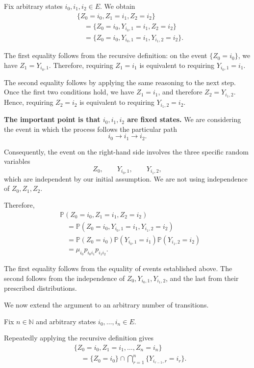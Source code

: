 \documentclass[11pt,a4paper]{article}
\begin{document}
Fix arbitrary states $i_0,i_1,i_2\in E$. We obtain
\[
\begin{aligned}
&\{Z_0=i_0,Z_1=i_1,Z_2=i_2\}\\
&\quad=
\{Z_0=i_0,Y_{i_0,1}=i_1,Z_2=i_2\}\\
&\quad=
\{Z_0=i_0,Y_{i_0,1}=i_1,Y_{i_1,2}=i_2\}.
\end{aligned}
\]

The first equality follows from the recursive definition: on the event $\{Z_0=i_0\}$, we have $Z_1=Y_{i_0,1}$. Therefore, requiring $Z_1=i_1$ is equivalent to requiring $Y_{i_0,1}=i_1$.

The second equality follows by applying the same reasoning to the next step. Once the first two conditions hold, we have $Z_1=i_1$, and therefore $Z_2=Y_{i_1,2}$. Hence, requiring $Z_2=i_2$ is equivalent to requiring $Y_{i_1,2}=i_2$.

\textbf{The important point is that $i_0,i_1,i_2$ are fixed states.} We are considering the event in which the process follows the particular path
\[
i_0\longrightarrow i_1\longrightarrow i_2.
\]

Consequently, the event on the right-hand side involves the three specific random variables
\[
Z_0,\qquad Y_{i_0,1},\qquad Y_{i_1,2},
\]
which are independent by our initial assumption. We are not using independence of $Z_0,Z_1,Z_2$.

Therefore,
\[
\begin{aligned}
&\mathbb P(Z_0=i_0,Z_1=i_1,Z_2=i_2)\\
&\quad=
\mathbb P(Z_0=i_0,Y_{i_0,1}=i_1,Y_{i_1,2}=i_2)\\
&\quad=
\mathbb P(Z_0=i_0)
\mathbb P(Y_{i_0,1}=i_1)
\mathbb P(Y_{i_1,2}=i_2)\\
&\quad=
\mu_{i_0}p_{i_0i_1}p_{i_1i_2}.
\end{aligned}
\]

The first equality follows from the equality of events established above. The second follows from the independence of $Z_0,Y_{i_0,1},Y_{i_1,2}$, and the last from their prescribed distributions.

We now extend the argument to an arbitrary number of transitions.

Fix $n\in\mathbb N$ and arbitrary states $i_0,\ldots,i_n\in E$.

Repeatedly applying the recursive definition gives
\[
\begin{aligned}
&\{Z_0=i_0,Z_1=i_1,\ldots,Z_n=i_n\}\\
&\quad=
\{Z_0=i_0\}
\cap
\bigcap_{r=1}^{n}
\{Y_{i_{r-1},r}=i_r\}.
\end{aligned}
\]
\end{document}
